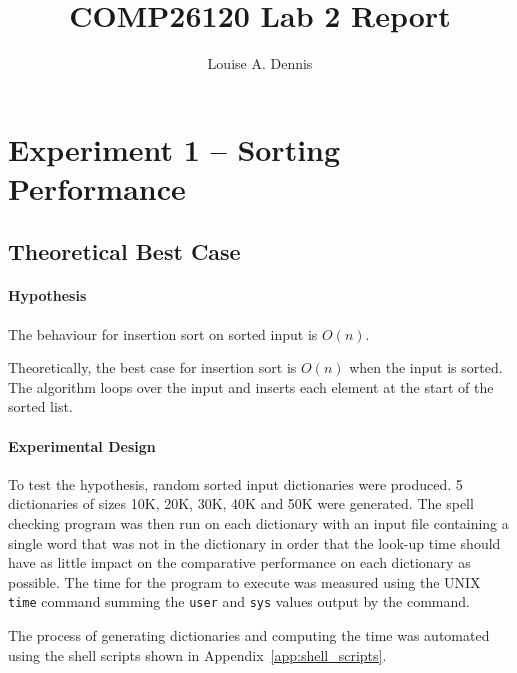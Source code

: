 \documentclass[a4]{article}
\title{COMP26120 Lab 2 Report}
\author{Louise A. Dennis}
\begin{document}
\maketitle

\section{Experiment 1 -- Sorting Performance}

\subsection{Theoretical Best Case}

\paragraph{Hypothesis} The behaviour for insertion sort on sorted input is $O(n)$. 

Theoretically, the best case for insertion sort is $O(n)$ when the input is sorted.  The algorithm loops over the input and inserts each element at the start of the sorted list.  

\paragraph{Experimental Design} To test the hypothesis, random sorted input dictionaries were produced. 5 dictionaries of sizes 10K, 20K, 30K, 40K and 50K were generated.  The spell checking program was then run on each dictionary with an input file containing a single word that was not in the dictionary in order that the look-up time should have as little impact on the comparative performance on each dictionary as possible.  The time for the program to execute was measured using the UNIX \texttt{time} command summing the \texttt{user} and \texttt{sys} values output by the command.  

The process of generating dictionaries and computing the time was automated using the shell scripts shown in Appendix~\ref{app:shell_scripts}.
\end{document}
